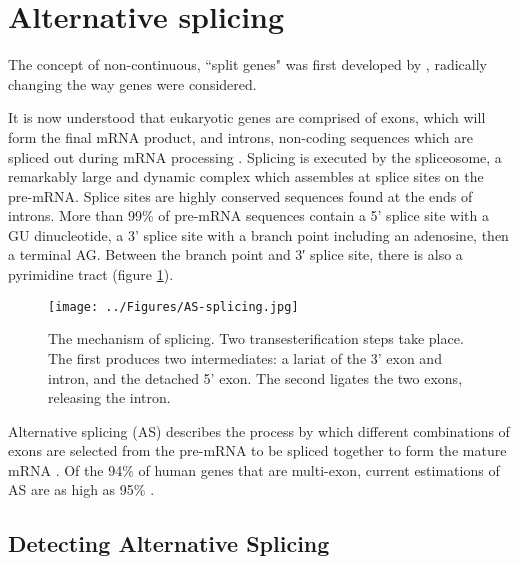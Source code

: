 \documentclass[12pt]{article}
\begin{document}
		
	\section{Alternative splicing}
		

		The concept of non-continuous, ``split genes" was first developed by \citet{Berget77}, radically changing the way genes were considered. 
			
		It is now understood that eukaryotic genes are comprised of exons, which will form the final mRNA product, and introns, non-coding sequences which are spliced out during mRNA processing \citep{Matlin05}.
		Splicing is executed by the spliceosome, a remarkably large and dynamic complex which assembles at splice sites on the pre-mRNA. 
		Splice sites are highly conserved sequences found at the ends of introns. 
		More than 99\% of pre-mRNA sequences contain a 5' splice site with a GU dinucleotide, a 3' splice site with a branch point including an adenosine, then a terminal AG.
		Between the branch point and 3′ splice site, there is also a pyrimidine tract \citep{Black03,Vanderfeltz12} (figure \ref{fig:AS-splicing}). 

			\begin{figure}[tb] %
				\centering
				\texttt{[image: ../Figures/AS-splicing.jpg]}
				\caption{The mechanism of splicing. Two transesterification steps take place.
				The first produces two intermediates: a lariat of the 3' exon and intron, and the detached 5' exon.
				The second ligates the two exons, releasing the intron. \citep[Figure sourced:][]{Black03}}
				\label{fig:AS-splicing}
			\end{figure}
		
		Alternative splicing (AS) describes the process by which different combinations of exons are selected from the pre-mRNA to be spliced together to form the mature mRNA \citep{Garcia-Blanco04}. 
		Of the 94\% of human genes that are multi-exon, current estimations of AS are as high as 95\% \citep{Pan08,Wang08}. 
			
		

		
		\subsection{Detecting Alternative Splicing}
		
\end{document}
